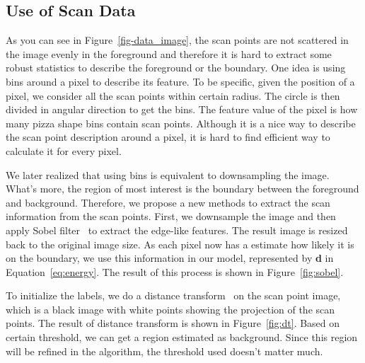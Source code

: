 \documentclass{article} %
\begin{document}
\subsection{Use of Scan Data}

As you can see in Figure~\ref{fig-data_image}, the scan points are not
scattered in the image evenly in the foreground and therefore it is
hard to extract some robust statistics to describe the foreground or
the boundary. One idea is using bins around a pixel to describe its
feature. To be specific, given the position of a pixel, we 
consider all the scan points within certain radius. The circle is then
divided in angular direction to get the bins. The feature value of the
pixel is how many pizza shape bins contain scan points. Although it is
a nice way to describe the scan point description around a pixel, it
is hard to find efficient way to calculate it for every
pixel.

We later realized that using bins is equivalent to downsampling the
image. What's more, the region of most interest is the boundary
between the foreground and background. Therefore, we propose a new
methods to extract the scan information from the scan points. First,
we downsample the image and then apply Sobel
filter~\citep{Szeliski2010} to extract the edge-like features. The
result image is resized back to the original image size. As each pixel
now has a estimate how likely it is on the boundary, we use this
information in our model, represented by \textbf{d} in
Equation~\eqref{eq:energy}. The result of this process is shown in
Figure~\ref{fig:sobel}.

To initialize the labels, we do a distance
transform~\citep{Borgefors1986Distance,Felzenszwalb2004Distance} on
the scan point image, which is a black image with white points showing
the projection of the scan points. The result of distance transform is
shown in Figure~\ref{fig:dt}. Based on certain threshold, we can
get a region estimated as background. Since this region will be
refined in the algorithm, the threshold used doesn't matter much.
\end{document}
